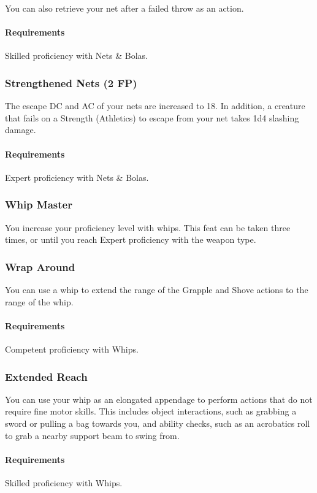     You can also retrieve your net after a failed throw as an action.
    \paragraph{Requirements} Skilled proficiency with Nets \& Bolas.
\subsubsection{Strengthened Nets (2 FP)} \label{feat::strengthenednets}
    The escape DC and AC of your nets are increased to 18.
    In addition, a creature that fails on a Strength (Athletics) to escape from your net takes 1d4 slashing damage.
    \paragraph{Requirements} Expert proficiency with Nets \& Bolas.
\subsubsection{Whip Master} \label{feat::whipmaster}
    You increase your proficiency level with whips.
    This feat can be taken three times, or until you reach Expert proficiency with the weapon type.
\subsubsection{Wrap Around} \label{feat::wraparound}
    You can use a whip to extend the range of the Grapple and Shove actions to the range of the whip.
    \paragraph{Requirements} Competent proficiency with Whips.
\subsubsection{Extended Reach} \label{feat::extendedreach}
    You can use your whip as an elongated appendage to perform actions that do not require fine motor skills.
    This includes object interactions, such as grabbing a sword or pulling a bag towards you, and ability checks, such as an acrobatics roll to grab a nearby support beam to swing from.
    \paragraph{Requirements} Skilled proficiency with Whips.

